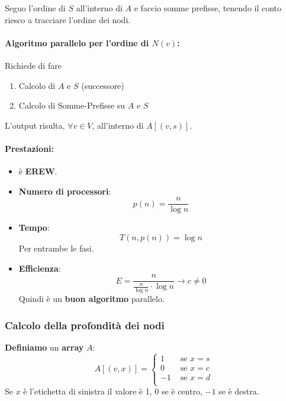 	Seguo l'ordine di $S$ all'interno di $A$ e faccio somme prefisse, tenendo il conto riesco a tracciare l'ordine dei nodi.\\
	
	\newpage
	
	\paragraph{Algoritmo parallelo per l'ordine di $N(v)$:} Richiede di fare
	\begin{enumerate}
		\item Calcolo di $A$ e $S$ (successore)
		\item Calcolo di Somme-Prefisse su $A$ e $S$
	\end{enumerate}
	L'output risulta, $\forall v \in V$, all'interno di $A[(v,s)]$.\\
	
	\paragraph{Prestazioni:}
	\begin{itemize}
		\item è \textbf{EREW}.\\
		
		\item \textbf{Numero di processori}: 
		$$ p(n) = \frac{n}{\log n} $$
		\nn
		
		\item \textbf{Tempo}: 
		$$ T(n, p(n)) = \log n$$
		Per entrambe le fasi.\\
		
		\item \textbf{Efficienza}: 
		$$ E = \frac{n}{\frac{n}{\log n} \cdot \log n} \rightarrow c \neq 0 $$
		Quindi è un \textbf{buon algoritmo} parallelo.\\
	\end{itemize}
	
	\newpage
	
	\subsubsection{Calcolo della profondità dei nodi}
	\textbf{Definiamo} un \textbf{array} $A$: 
	$$ 
	A [(v,x)] = \begin{cases}
		1 & \text{ se } x = s \\
		0 & \text{ se } x = c \\
		-1 & \text{ se } x = d \\
	\end{cases}
	$$
	Se $x$ è l'etichetta di sinistra il valore è 1, 0 se è centro, $-1$ se è destra.\\
	
